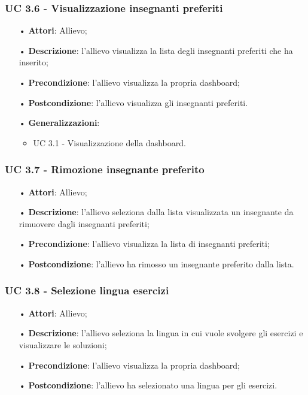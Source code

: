 \subsubsection{UC 3.6 - Visualizzazione insegnanti preferiti}
\begin{itemize}
	\item[•]\textbf{Attori}: Allievo;
	\item[•]\textbf{Descrizione}: l'allievo visualizza la lista degli insegnanti preferiti che ha inserito;
	\item[•]\textbf{Precondizione}: l'allievo visualizza la propria dashboard;
	\item[•]\textbf{Postcondizione}: l'allievo visualizza gli insegnanti preferiti.
	\item[•]\textbf{Generalizzazioni}:
\begin{itemize}
\item UC 3.1 - Visualizzazione della dashboard.
\end{itemize}
\end{itemize}

\subsubsection{UC 3.7 - Rimozione insegnante preferito}
\begin{itemize}
	\item[•]\textbf{Attori}: Allievo;
	\item[•]\textbf{Descrizione}: l'allievo seleziona dalla lista visualizzata un insegnante da rimuovere dagli insegnanti preferiti;
	\item[•]\textbf{Precondizione}: l'allievo visualizza la lista di insegnanti preferiti;
	\item[•]\textbf{Postcondizione}: l'allievo ha rimosso un insegnante preferito dalla lista.
\end{itemize}

\subsubsection{UC 3.8 - Selezione lingua esercizi}
\begin{itemize}
	\item[•]\textbf{Attori}: Allievo;
	\item[•]\textbf{Descrizione}: l'allievo seleziona la lingua in cui vuole svolgere gli esercizi e visualizzare le soluzioni;
	\item[•]\textbf{Precondizione}: l'allievo visualizza la propria dashboard;
	\item[•]\textbf{Postcondizione}: l'allievo ha selezionato una lingua per gli esercizi.
\end{itemize}

